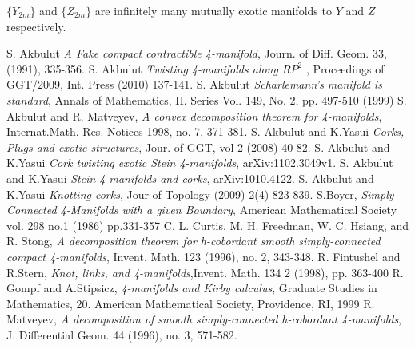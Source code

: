 \documentclass[11pt]{amsart}
\begin{document}
\begin{conj}
$\{Y_{2m}\}$ and $\{Z_{2m}\}$ are infinitely many mutually exotic manifolds to $Y$ and $Z$ respectively.
\end{conj}
\begin{thebibliography}{10}
\bibitem[A1]{[A1]} S. Akbulut {\it A Fake compact contractible 4-manifold}, Journ. of Diff. Geom. 33, (1991), 335-356.
\bibitem[A2]{[A2]} S. Akbulut {\it Twisting 4-manifolds along $RP^2$ }, Proceedings of GGT/2009, Int. Press (2010) 137-141. 
\bibitem[A3]{[A3]} S. Akbulut {\it Scharlemann's manifold is standard}, Annals of Mathematics, II. Series Vol. 149, No. 2, pp. 497-510 (1999) 
\bibitem[AM]{[AM]} S. Akbulut and R. Matveyev, {\it A convex decomposition theorem for 4-manifolds}, Internat.Math. Res. Notices 1998, no. 7, 371-381.
\bibitem[AY1]{[AY1]} S. Akbulut and K.Yasui {\it Corks, Plugs and exotic structures}, Jour. of GGT, vol 2 (2008) 40-82.
\bibitem[AY2]{[AY2]} S. Akbulut and K.Yasui {\it Cork twisting exotic Stein 4-manifolds}, arXiv:1102.3049v1.
\bibitem[AY3]{[AY3]} S. Akbulut and K.Yasui {\it Stein 4-manifolds and corks}, arXiv:1010.4122.
\bibitem[AY4]{[AY4]} S. Akbulut and K.Yasui {\it Knotting corks}, Jour of Topology (2009) 2(4) 823-839. 
\bibitem[B]{[B]} S.Boyer, {\it Simply-Connected 4-Manifolds with a given Boundary},
American Mathematical Society vol. 298 no.1 (1986) pp.331-357
\bibitem[CFHS]{[CFHS]} C. L. Curtis, M. H. Freedman, W. C. Hsiang, and R. Stong, {\it A decomposition theorem for
h-cobordant smooth simply-connected compact 4-manifolds}, Invent. Math. 123 (1996), no. 2,
343-348.
\bibitem[FS]{[FS]} R. Fintushel and R.Stern, {\it Knot, links, and 4-manifolds},Invent. Math. 134 2 (1998), pp. 363-400
\bibitem[GS]{[GS]} R. Gompf and A.Stipsicz, {\it 4-manifolds and Kirby calculus},
Graduate Studies in Mathematics, 20. American Mathematical Society, Providence, RI, 1999
\bibitem[M]{[M]} R. Matveyev, {\it A decomposition of smooth simply-connected h-cobordant 4-manifolds}, J. Differential
Geom. 44 (1996), no. 3, 571-582.
\end{thebibliography}
\end{document}
